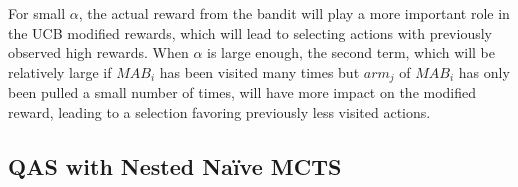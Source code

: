 \documentclass[a4paper,onecolumn,11pt]{quantumarticle}
\begin{document}
For small $\alpha$, the actual reward from the bandit will play a more important role in the UCB modified rewards, which will lead to selecting actions with previously observed high rewards. When $\alpha$ is large enough, the second term, which will be relatively large if $MAB_i$ has been visited many times but $arm_j$ of $MAB_i$ has only been pulled a small number of times, will have more impact on the modified reward, leading to a selection favoring previously less visited actions.

\subsection{QAS with Nested Na\"ive MCTS}

\end{document}
